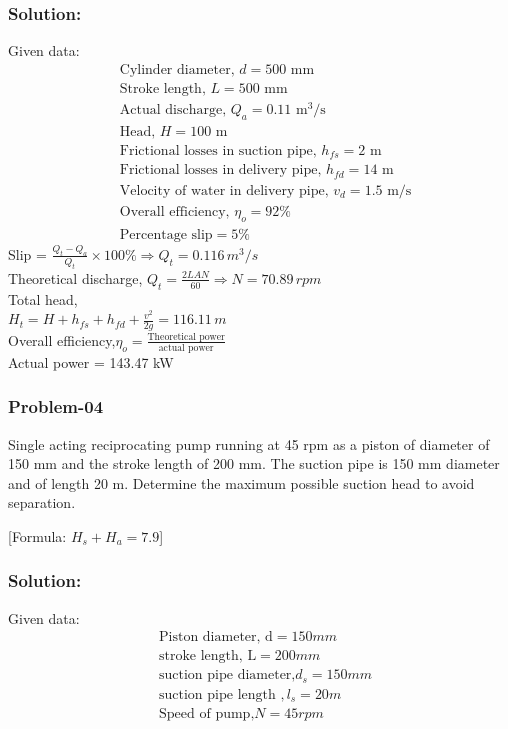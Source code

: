 \documentclass{article}
\begin{document}
\begin{multicols}{2}
      \subsubsection*{Solution:}
      Given data: \\
      \begin{align*}
        &\text{Cylinder diameter, } d = 500 \text{ mm} \\
        &\text{Stroke length, } L = 500 \text{ mm} \\
        &\text{Actual discharge, } Q_a = 0.11 \text{ m}^3/\text{s} \\
        &\text{Head, } H = 100 \text{ m} \\
        &\text{Frictional losses in suction pipe, } h_{fs} = 2 \text{ m} \\
        &\text{Frictional losses in delivery pipe, } h_{fd} = 14 \text{ m} \\
        &\text{Velocity of water in delivery pipe, } v_d = 1.5 \text{ m/s} \\ 
        &\text{Overall efficiency, } \eta_o = 92\% \\
        &\text{Percentage slip} = 5\%  
      \end{align*}
      Slip = $\frac{Q_t - Q_a}{Q_t} \times 100\% \Rightarrow Q_t = 0.116 \, m^3/s $   \\
      Theoretical discharge, $Q_t = \frac{2LAN}{60} \Rightarrow  N = 70.89 \, rpm $  \\
      Total head, \\
      $H_t = H + h_{fs} + h_{fd} + \frac{v^2}{2g} = 116.11 \,m$ \\


      Overall efficiency,$\eta_o = \frac{\text{Theoretical power}}{\text{actual power}}$ \\
      Actual power = 143.47 kW  

      \subsubsection*{Problem-04}
      Single acting reciprocating pump running at 45 rpm as a piston of diameter of 150 mm and the stroke length of 200 mm. The suction pipe is 150 mm diameter and of length 20 m. Determine the maximum possible suction head to avoid separation. 

      [Formula: $H_s + H_a = 7.9$]

      \subsubsection*{Solution:}
      Given data:
      \begin{align*}
        &\text{Piston diameter, d} = 150 mm \\
        &\text{stroke length, L} = 200 mm \\
        &\text{suction pipe diameter,} d_s = 150 mm \\
        &\text{suction pipe length }, l_s = 20 m \\
        &\text{Speed of pump,} N = 45 rpm 
      \end{align*}


\end{multicols}
\end{document}
